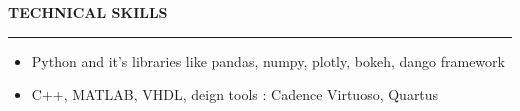 \documentclass[10 pt]{article}%
\begin{document}
{{{{{{{{%
\begin{flushleft}\bf{\Large{\textcolor{color2}{TECHNICAL SKILLS}}}\end{flushleft}
\vspace{-5pt}
\hrule
\vspace{1 pt}
\begin{itemize}[leftmargin=*]
	\setlength\itemsep{1.5pt}
	\setlength\parskip{1.5pt}
	\item Python and it's libraries like pandas, numpy, plotly, bokeh, dango framework
	\item C++, MATLAB, VHDL, deign tools : Cadence Virtuoso, Quartus
\end{itemize}

}}}}}}}}
\end{document}
